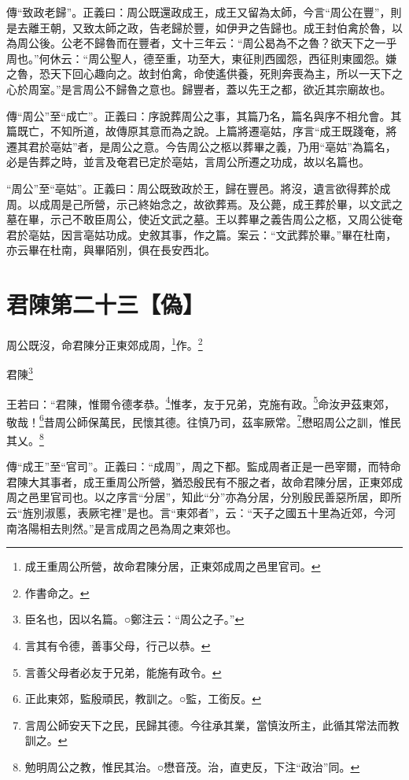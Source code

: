 {\noindent\zhuan{}\fzbyks 傳“致政老歸”。正義曰：周公既還政成王，成王又留為太師，今言“周公在豐”，則是去離王朝，又致太師之政，告老歸於豐，如伊尹之告歸也。成王封伯禽於魯，以為周公後。公老不歸魯而在豐者，文十三年云：“周公曷為不之魯？欲天下之一乎周也。”何休云：“周公聖人，德至重，功至大，東征則西國怨，西征則東國怨。嫌之魯，恐天下回心趣向之。故封伯禽，命使遙供養，死則奔喪為主，所以一天下之心於周室。”是言周公不歸魯之意也。歸豐者，蓋以先王之都，欲近其宗廟故也。 \par}

{\noindent\zhuan{}\fzbyks 傳“周公”至“成亡”。正義曰：序說葬周公之事，其篇乃名，篇名與序不相允會。其篇既亡，不知所道，故傳原其意而為之說。上篇將遷亳姑，序言“成王既踐奄，將遷其君於亳姑”者，是周公之意。今告周公之柩以葬畢之義，乃用“亳姑”為篇名，必是告葬之時，並言及奄君已定於亳姑，言周公所遷之功成，故以名篇也。 \par}

{\noindent\shu{}\fzkt “周公”至“亳姑”。正義曰：周公既致政於王，歸在豐邑。將沒，遺言欲得葬於成周。以成周是己所營，示己終始念之，故欲葬焉。及公薨，成王葬於畢，以文武之墓在畢，示己不敢臣周公，使近文武之墓。王以葬畢之義告周公之柩，又周公徙奄君於亳姑，因言亳姑功成。史敘其事，作之篇。案云：“文武葬於畢。”畢在杜南，亦云畢在杜南，與畢陌別，俱在長安西北。 \par}

\section{君陳第二十三【偽】}


周公既沒，命君陳分正東郊成周，\footnote{成王重周公所營，故命君陳分居，正東郊成周之邑里官司。}作。\footnote{作書命之。}

君陳\footnote{臣名也，因以名篇。○鄭注云：“周公之子。”}

王若曰：“君陳，惟爾令德孝恭。\footnote{言其有令德，善事父母，行己以恭。}惟孝，友于兄弟，克施有政。\footnote{言善父母者必友于兄弟，能施有政令。}命汝尹茲東郊，敬哉！\footnote{正此東郊，監殷頑民，教訓之。○監，工銜反。}昔周公師保萬民，民懷其德。往慎乃司，茲率厥常。\footnote{言周公師安天下之民，民歸其德。今往承其業，當慎汝所主，此循其常法而教訓之。}懋昭周公之訓，惟民其乂。\footnote{勉明周公之教，惟民其治。○懋音茂。治，直吏反，下注“政治”同。}


{\noindent\zhuan{}\fzbyks 傳“成王”至“官司”。正義曰：“成周”，周之下都。監成周者正是一邑宰爾，而特命君陳大其事者，成王重周公所營，猶恐殷民有不服之者，故命君陳分居，正東郊成周之邑里官司也。以之序言“分居”，知此“分”亦為分居，分別殷民善惡所居，即所云“旌別淑慝，表厥宅裡”是也。言“東郊者”，云：“天子之國五十里為近郊，今河南洛陽相去則然。”是言成周之邑為周之東郊也。 \par}

